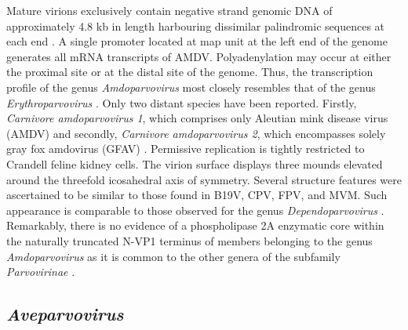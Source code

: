 Mature virions exclusively contain negative strand genomic DNA of approximately 4.8 kb in length harbouring dissimilar palindromic sequences at each end \cite{pmid6252342, pmid2843669}. A single promoter located at map unit at the left end of the genome generates all mRNA transcripts of AMDV.  Polyadenylation may occur at either the proximal site or at the distal site of the genome. Thus, the transcription profile of the genus \textit{Amdoparvovirus} most closely resembles  that of the genus \textit{Erythroparvovirus} \cite{pmid16378968}.  
Only two distant species have been reported. Firstly, \textit{Carnivore amdoparvovirus 1}, which comprises only Aleutian mink disease virus (AMDV) and secondly, \textit{Carnivore amdoparvovirus 2}, which encompasses solely gray fox amdovirus (GFAV) \cite{pmid22000359}. 
Permissive replication is tightly restricted to Crandell feline kidney cells. The virion surface displays three mounds elevated around the threefold icosahedral axis of symmetry. Several structure features were ascertained to be similar to those found in B19V, CPV, FPV, and MVM. Such appearance is comparable to those observed for the genus \textit{Dependoparvovirus} \cite{pmid10400786}. Remarkably, there is no evidence of a phospholipase 2A enzymatic core within the naturally truncated N-VP1 terminus of members belonging to the genus \textit{Amdoparvovirus} as it is common to the other genera of the subfamily \textit{Parvovirinae} \cite{icvt}. 



\subsection{\textit{Aveparvovirus}}


